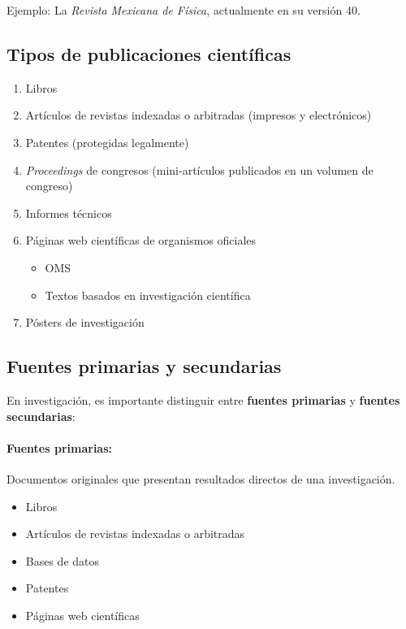 \documentclass{article}
\begin{document}
Ejemplo: La \textit{Revista Mexicana de Física}, actualmente en su versión 40.

\subsection{Tipos de publicaciones científicas} \vspace{0.5cm}

\begin{enumerate}
	\item Libros
	\item Artículos de revistas indexadas o arbitradas (impresos y electrónicos)
	\item Patentes (protegidas legalmente)
	\item \textit{Proceedings} de congresos (mini-artículos publicados en un volumen de congreso)
	\item Informes técnicos
	\item Páginas web científicas de organismos oficiales
	\begin{itemize}
		\item OMS
		\item Textos basados en investigación científica
	\end{itemize}
	\item Pósters de investigación
\end{enumerate} \vspace{0.5cm}

\subsection{Fuentes primarias y secundarias} \vspace{0.5cm}

En investigación, es importante distinguir entre \textbf{fuentes primarias} y \textbf{fuentes secundarias}:

\paragraph{Fuentes primarias:}  
Documentos originales que presentan resultados directos de una investigación.
\begin{itemize}
	\item Libros
	\item Artículos de revistas indexadas o arbitradas
	\item Bases de datos
	\item Patentes
	\item Páginas web científicas
\end{itemize}
\end{document}
